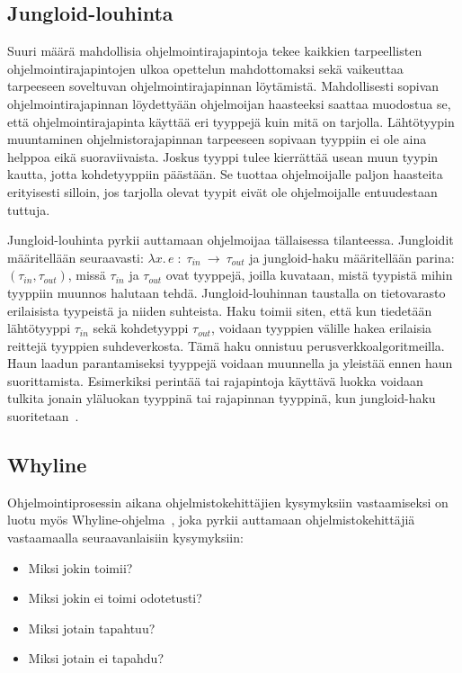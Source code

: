 \documentclass[finnish]{tktltiki2}
\theoremstyle{definition}
\theoremstyle{remark}
\begin{document}
\subsection{Jungloid-louhinta}
Suuri määrä mahdollisia ohjelmointirajapintoja tekee kaikkien tarpeellisten ohjelmointirajapintojen ulkoa opettelun mahdottomaksi sekä vaikeuttaa tarpeeseen soveltuvan ohjelmointirajapinnan löytämistä. Mahdollisesti sopivan ohjelmointirajapinnan löydettyään ohjelmoijan haasteeksi saattaa muodostua se, että ohjelmointirajapinta käyttää eri tyyppejä kuin mitä on tarjolla. Lähtötyypin muuntaminen ohjelmistorajapinnan tarpeeseen sopivaan tyyppiin ei ole aina helppoa eikä suoraviivaista. Joskus tyyppi tulee kierrättää usean muun tyypin kautta, jotta kohdetyyppiin päästään. Se tuottaa ohjelmoijalle paljon haasteita erityisesti silloin, jos tarjolla olevat tyypit eivät ole ohjelmoijalle entuudestaan tuttuja.

Jungloid-louhinta pyrkii auttamaan ohjelmoijaa tällaisessa tilanteessa.
Jungloidit määritellään seuraavasti: $ \lambda x.\, e\; :\; \tau_{in}\:\to\:\tau_{out}$ ja jungloid-haku määritellään parina: $(\tau_{in}, \tau_{out})$, missä $\tau_{in}$ ja $\tau_{out}$ ovat tyyppejä, joilla kuvataan, mistä tyypistä mihin tyyppiin muunnos halutaan tehdä. Jungloid-louhinnan taustalla on tietovarasto erilaisista tyypeistä ja niiden suhteista. Haku toimii siten, että kun tiedetään lähtötyyppi $\tau_{in}$ sekä kohdetyyppi $\tau_{out}$, voidaan tyyppien välille hakea erilaisia reittejä tyyppien suhdeverkosta. Tämä haku onnistuu perusverkkoalgoritmeilla. Haun laadun parantamiseksi tyyppejä voidaan muunnella ja yleistää ennen haun suorittamista. Esimerkiksi perintää tai rajapintoja käyttävä luokka voidaan tulkita jonain yläluokan tyyppinä tai rajapinnan tyyppinä, kun jungloid-haku suoritetaan~\cite{jungloid-mining}.

\subsection{Whyline}
Ohjelmointiprosessin aikana ohjelmistokehittäjien kysymyksiin vastaamiseksi on luotu myös Whyline-ohjelma~\cite{whyline}, joka pyrkii auttamaan ohjelmistokehittäjiä vastaamaalla seuraavanlaisiin kysymyksiin:

\begin{itemize}
  \item Miksi jokin toimii?
  \item Miksi jokin ei toimi odotetusti?
  \item Miksi jotain tapahtuu?
  \item Miksi jotain ei tapahdu?
\end{itemize}
\end{document}
